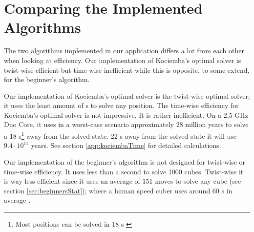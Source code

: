 \section{Comparing the Implemented Algorithms}
The two algorithms implemented in our application differs a lot from each other when looking at efficiency. 
Our implementation of Kociemba's optimal solver is twist-wise efficient but time-wise inefficient while this is opposite, to some extend, for the beginner's algorithm. 

Our implementation of Kociemba's optimal solver is the twist-wise optimal solver; it uses the least amount of \twist{}s to solve any position.
The time-wise efficiency for Kociemba's optimal solver is not impressive. It is rather inefficient. On a 2,5 GHz Duo Core, it uses in a worst-case scenario approximately 28 million years to solve a \cube{} 18 \twist{}s\footnote{Most positions can be solved in 18 \twist{}s \cite{kociemba09}} away from the solved state. 22 \twist{}s away from the solved state it will use $9.4\cdot{}10^{11}$ years. See section \ref{app:kociembaTime} for detailed calculations.   

Our implementation of the beginner's algorithm is not designed for twist-wise or time-wise efficiency. It uses less than a second to solve 1000 cubes. 
Twist-wise it is way less efficient since it uses an average of 151 moves to solve any cube (see section \ref{sec:beginnersStat}); where a human speed cuber uses around 60 \twist{}s in average \cite{larsPetrus97} \cite{cubeFreak}.

